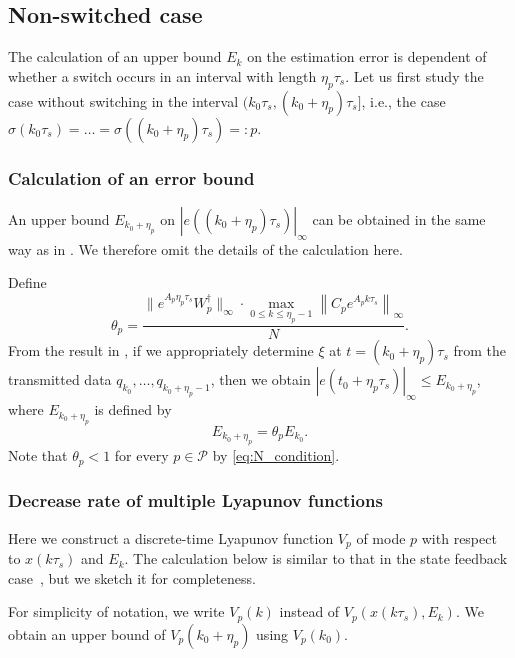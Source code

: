 \documentclass[letterpaper, 11pt, onecolumn]{ieeeconf}  \IEEEoverridecommandlockouts
\begin{document}
\subsection{Non-switched case}
The calculation of an upper bound $E_k$ on the estimation error
is dependent of whether 
a switch occurs in an interval with length $\eta_p \tau_s$.
Let us first study the case without switching in the interval
$(k_0\tau_s, (k_0+\eta_p) \tau_s]$, i.e., the case 
$\sigma(k_0\tau_s)  = \dots = \sigma((k_0+\eta_p) \tau_s) =: p$.

\subsubsection{Calculation of an error bound}
An upper bound $E_{k_0 + \eta_p}$ on $|e((k_0+\eta_p)\tau_s)|_{\infty}$ can be
obtained in the same way as in \cite{Liberzon2003}.
We therefore omit the details of the calculation here. 



Define
\begin{equation}
\label{eq:gamma_p_def}
\theta_p = \frac{\|e^{A_p \eta_p \tau_s}W_p^{\dagger}\|_{\infty}
\cdot \max_{0\leq k \leq \eta_p-1}\left\|C_pe^{A_p k \tau_s}\right\|_{\infty}}{N}.
\end{equation}
From the result in \cite{Liberzon2003}, 
if we appropriately determine $\xi$ at $t=(k_0+\eta_p)\tau_s$
from the transmitted data $q_{k_0},\dots,q_{k_0+\eta_p-1}$,
then we obtain
$|e(t_0 + \eta_p \tau_s)|_{\infty} \leq E_{k_0+\eta_p}$, where
$E_{k_0+\eta_p}$ is defined by
\begin{equation}
\label{eq:e_noswitch_bound}
E_{k_0+\eta_p} = \theta_p E_{k_0}.
\end{equation}
Note that $\theta_p < 1$ for every $p \in \mathcal{P}$ 
by \eqref{eq:N_condition}.

\subsubsection{Decrease rate of multiple Lyapunov functions}
Here we construct a discrete-time Lyapunov function $V_p$ of mode $p$ 
with respect to $x(k\tau_s)$ and $E_k$.
The calculation below 
is similar to that in the state feedback case~\cite{Liberzon2014}, but
we sketch it for completeness.

For simplicity of notation, we write $V_p(k)$ instead of
$V_p(x(k\tau_s), E_k)$.
We obtain an upper bound of $V_p(k_0+\eta_p)$ using $V_p(k_0)$.
\end{document}
